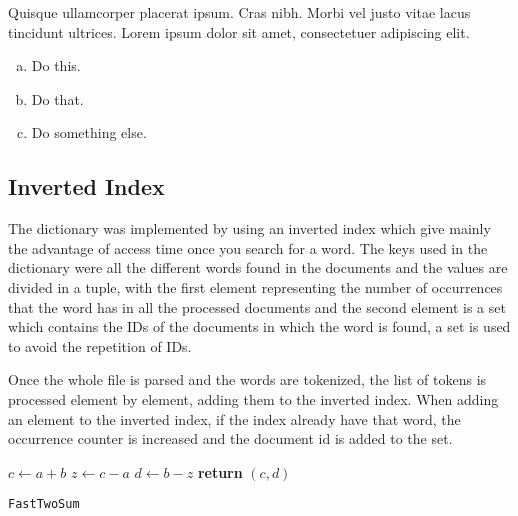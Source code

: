 \documentclass{article}
\begin{document}
\begin{question}
	Quisque ullamcorper placerat ipsum. Cras nibh. Morbi vel justo vitae lacus tincidunt ultrices. Lorem ipsum dolor sit amet, consectetuer adipiscing elit.

	\begin{enumerate}[(a)]
		\item Do this.
		\item Do that.
		\item Do something else.
	\end{enumerate}
\end{question}
	

\subsection{Inverted Index}

The dictionary was implemented by using an inverted index which give mainly the advantage of access time once you search for a word. The keys used in the dictionary were all the different words found in the documents  and the values are divided in a tuple, with the first element representing the number of occurrences that the word has in all the processed documents and the second element is a set which contains the IDs of the documents in which the word is found, a set is used to avoid the repetition of IDs.

Once the whole file is parsed and the words are tokenized, the list of tokens is processed element by element, adding them to the inverted index. When adding an element to the inverted index, if the index already have that word, the occurrence counter is increased and the document id is added to the set.

\begin{center}
	\begin{minipage}{0.5\linewidth} %
		\begin{algorithm}[H]
			\medskip
			$c \leftarrow a + b$ \;
			$z \leftarrow c - a$ \;
			$d \leftarrow b - z$ \;
			{\bf return} $(c,d)$ \;
			\caption{\texttt{FastTwoSum}} %
			\label{alg:fastTwoSum}   %
		\end{algorithm}
	\end{minipage}
\end{center}
\end{document}

